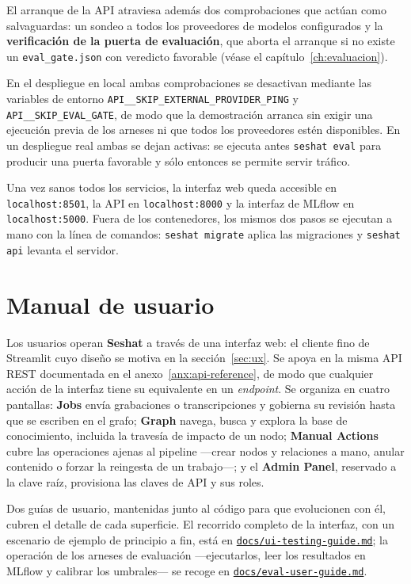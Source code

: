 El arranque de la \ac{API} atraviesa además dos comprobaciones que actúan como salvaguardas: un
sondeo a todos los proveedores de modelos configurados y la \textbf{verificación de la puerta de
evaluación}, que aborta el arranque si no existe un \texttt{eval\_gate.json} con veredicto favorable
(véase el capítulo~\ref{ch:evaluacion}).

En el despliegue en local ambas comprobaciones se desactivan mediante las variables de entorno
\texttt{API\_\_SKIP\_EXTERNAL\_PROVIDER\_PING} y \texttt{API\_\_SKIP\_EVAL\_GATE}, de modo
que la demostración arranca sin exigir una ejecución previa de los arneses ni que todos los
proveedores estén disponibles. En un despliegue real ambas se dejan activas: se ejecuta antes
\texttt{seshat eval} para producir una puerta favorable y sólo entonces se permite servir tráfico.

Una vez sanos todos los servicios, la interfaz web queda accesible en \texttt{localhost:8501}, la
\ac{API} en \texttt{localhost:8000} y la interfaz de MLflow en \texttt{localhost:5000}. Fuera de los
contenedores, los mismos dos pasos se ejecutan a mano con la línea de comandos: \texttt{seshat
migrate} aplica las migraciones y \texttt{seshat api} levanta el servidor.

\section{Manual de usuario}
\label{anx:despliegue-manual}

Los usuarios operan \textbf{Seshat} a través de una interfaz web: el cliente fino de Streamlit cuyo
diseño se motiva en la sección~\ref{sec:ux}. Se apoya en la misma \ac{API} REST documentada en el
anexo~\ref{anx:api-reference}, de modo que cualquier acción de la interfaz tiene su equivalente en un
\textit{endpoint}. Se organiza en cuatro pantallas: \textbf{Jobs}
envía grabaciones o transcripciones y gobierna su revisión hasta que se escriben en el grafo;
\textbf{Graph} navega, busca y explora la base de conocimiento, incluida la travesía de impacto de un
nodo; \textbf{Manual Actions} cubre las operaciones ajenas al pipeline —crear nodos y relaciones a
mano, anular contenido o forzar la reingesta de un trabajo—; y el \textbf{Admin Panel}, reservado a
la clave raíz, provisiona las claves de \ac{API} y sus roles.

Dos guías de usuario, mantenidas junto al código para que evolucionen con él, cubren el detalle de
cada superficie. El recorrido completo de la interfaz, con un escenario de ejemplo de principio a
fin, está en
\href{https://github.com/josepmafe/seshat/blob/main/docs/ui-testing-guide.md}{\texttt{docs/ui-testing-guide.md}};
la operación de los arneses de evaluación —ejecutarlos, leer los resultados en MLflow y calibrar los
umbrales— se recoge en
\href{https://github.com/josepmafe/seshat/blob/main/docs/eval-user-guide.md}{\texttt{docs/eval-user-guide.md}}.
